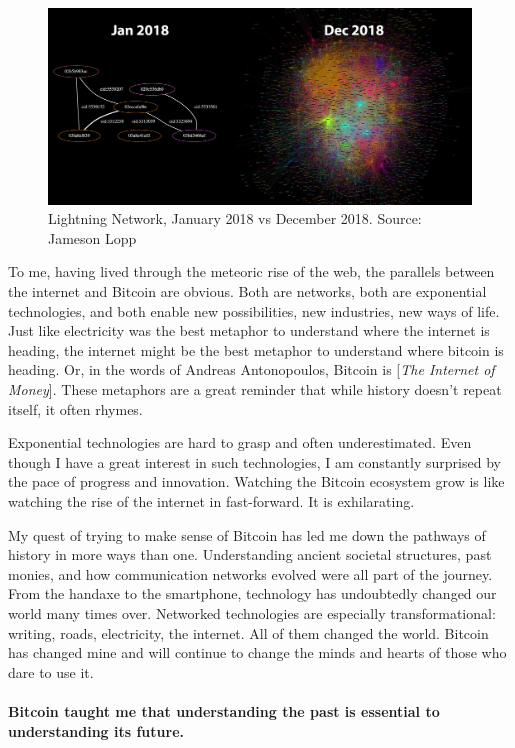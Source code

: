 \begin{figure}
  \includegraphics{assets/images/lnd-growth-lopp-black.png}
  \caption{Lightning Network, January 2018 vs December 2018. Source: Jameson Lopp}
  \label{fig:lnd-growth-lopp-black.png}
\end{figure}

To me, having lived through the meteoric rise of the web, the parallels
between the internet and Bitcoin are obvious. Both are networks, both
are exponential technologies, and both enable new possibilities, new
industries, new ways of life. Just like electricity was the best
metaphor to understand where the internet is heading, the internet might
be the best metaphor to understand where bitcoin is heading. Or, in the
words of Andreas Antonopoulos, Bitcoin is [\textit{The Internet of Money}].
These metaphors are a great reminder that while history doesn't repeat
itself, it often rhymes.

Exponential technologies are hard to grasp and often underestimated.
Even though I have a great interest in such technologies, I am
constantly surprised by the pace of progress and innovation. Watching
the Bitcoin ecosystem grow is like watching the rise of the internet in
fast-forward. It is exhilarating.

My quest of trying to make sense of Bitcoin has led me down the pathways
of history in more ways than one. Understanding ancient societal
structures, past monies, and how communication networks evolved were all
part of the journey. From the handaxe to the smartphone, technology has
undoubtedly changed our world many times over. Networked technologies
are especially transformational: writing, roads, electricity, the
internet. All of them changed the world. Bitcoin has changed mine and
will continue to change the minds and hearts of those who dare to use
it.

\paragraph{Bitcoin taught me that understanding the past is essential to
understanding its future.}

